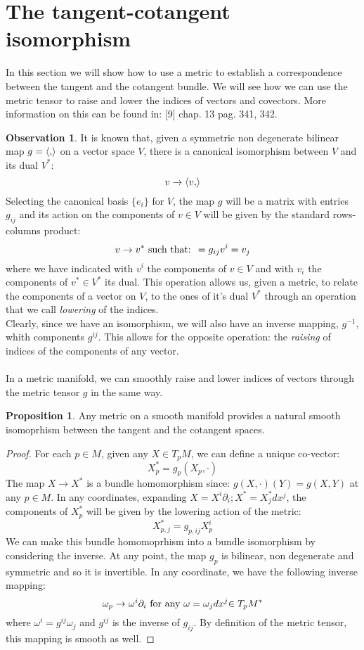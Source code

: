\documentclass[12pt,a4paper]{report}
\theoremstyle{definition}
\theoremstyle{Theorem}
\newtheorem{Prop}[Def]{Proposition}
\theoremstyle{definition}
\theoremstyle{definition}
\newtheorem{Obs}[Def]{Observation}
\begin{document}
	\section{The tangent-cotangent isomorphism}\label{Sec_3.3}
		In this section we will show how to use a metric to establish a correspondence between the tangent and the cotangent bundle. We will see how we can use the metric tensor to raise and lower the indices of vectors and covectors. More information on this can be found in: [9] chap. 13 pag. 341, 342.
		\begin{Obs}
		It is known that, given a symmetric non degenerate bilinear map $g=\braket{,}$ on a vector space $V$, there is a canonical isomorphism between $V$ and its dual $V^*$:
		$$v\rightarrow\braket{v,}$$
		Selecting the canonical basis $\{e_i\}$ for $V$, the map $g$ will be a matrix with entries $g_{ij}$ and its action on the components of $v\in V$ will be given by the standard rows-columns product:
		$$v\rightarrow
		v^*\hbox{ such that: }=g_{ij}v^i=v_j$$
		where we have indicated with $v^i$ the components of $v\in V$ and with $v_i$ the components of $v^*\in V^*$ its dual. This operation allows us, given a metric, to relate the components of a vector on $V$, to the ones of it's dual $V^*$ through an operation that we call \textit{lowering} of the indices.\\
		Clearly, since we have an isomorphism, we will also have an inverse mapping, $g^{-1}$, whith components $g^{ij}$. This allows for the opposite operation: the \textit{raising} of indices of the components of any vector.\\
		\\
		In a metric manifold, we can smoothly raise and lower indices of vectors through the metric tensor $g$ in the same way.
	\end{Obs}
	\begin{Prop}
		Any metric on a smooth manifold provides a natural smooth isomoprhism between the tangent and the cotangent spaces.
	\end{Prop}
	\begin{proof}
		For each $p\in M$, given any $X\in T_pM$, we can define a unique co-vector: 
		$$X^*_p=g_p(X_p,\cdot)$$
		The map $X\rightarrow X^*$ is a bundle homomorphism since: $g(X,\cdot )(Y)=g(X,Y)$ at any $p\in M$.
		In any coordinates, expanding $X=X^i\partial_i;X^*=X^*_jdx^j$, the components of $X^*_p$ will be given by the lowering action of the metric:
		$$X^*_{p,j}=g_{p,ij}X_p^i$$
		We can make this bundle homomoprhism into a bundle isomorphism by considering the inverse. At any point, the map $g_p$ is bilinear, non degenerate and symmetric and so it is invertible. In any coordinate, we have the following inverse mapping:
		$$\omega_p\rightarrow\omega^i\partial_i\hbox{ for any }\omega=\omega_jdx^j{\in T_pM^*}$$
		where $\omega^i=g^{ij}\omega_j$ and $g^{ij}$ is the inverse of $g_{ij}$. By definition of the metric tensor, this mapping is smooth as well. 
	\end{proof}
\end{document}

